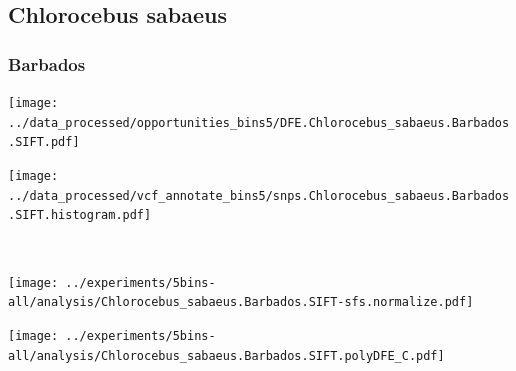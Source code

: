 \subsection{Chlorocebus sabaeus}

\subsubsection{Barbados}

\begin{minipage}{0.49\linewidth}
    \texttt{[image: ../data\_processed/opportunities\_bins5/DFE.Chlorocebus\_sabaeus.Barbados.SIFT.pdf]}
\end{minipage}
\begin{minipage}{0.49\linewidth}
    \texttt{[image: ../data\_processed/vcf\_annotate\_bins5/snps.Chlorocebus\_sabaeus.Barbados.SIFT.histogram.pdf]}
\end{minipage}
\\
\begin{minipage}{0.49\linewidth}
    \texttt{[image: ../experiments/5bins-all/analysis/Chlorocebus\_sabaeus.Barbados.SIFT-sfs.normalize.pdf]}
\end{minipage}
\begin{minipage}{0.4\linewidth}
    \texttt{[image: ../experiments/5bins-all/analysis/Chlorocebus\_sabaeus.Barbados.SIFT.polyDFE\_C.pdf]}
\end{minipage}
